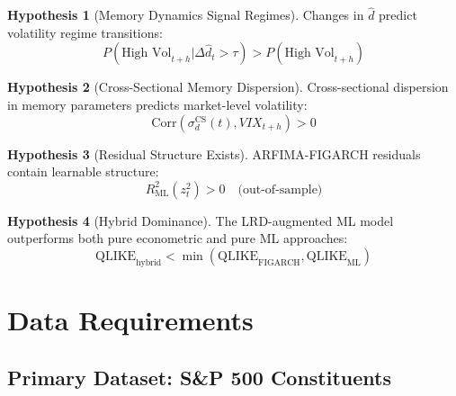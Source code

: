 \documentclass[11pt,a4paper]{article}
\theoremstyle{definition}
\newtheorem{hypothesis}{Hypothesis}[section]
\newcommand{\Corr}{\text{Corr}}
\newcommand{\dhat}{\hat{d}}
\begin{document}
\begin{hypothesis}[Memory Dynamics Signal Regimes]
Changes in $\dhat$ predict volatility regime transitions:
\begin{equation}
    P(\text{High Vol}_{t+h} | \Delta\dhat_t > \tau) > P(\text{High Vol}_{t+h})
\end{equation}
\end{hypothesis}

\begin{hypothesis}[Cross-Sectional Memory Dispersion]
Cross-sectional dispersion in memory parameters predicts market-level volatility:
\begin{equation}
    \Corr\left(\sigma_d^{\text{CS}}(t), VIX_{t+h}\right) > 0
\end{equation}
\end{hypothesis}

\begin{hypothesis}[Residual Structure Exists]
ARFIMA-FIGARCH residuals contain learnable structure:
\begin{equation}
    R^2_{\text{ML}}(z_t^2) > 0 \quad \text{(out-of-sample)}
\end{equation}
\end{hypothesis}

\begin{hypothesis}[Hybrid Dominance]
The LRD-augmented ML model outperforms both pure econometric and pure ML approaches:
\begin{equation}
    \text{QLIKE}_{\text{hybrid}} < \min\left(\text{QLIKE}_{\text{FIGARCH}}, \text{QLIKE}_{\text{ML}}\right)
\end{equation}
\end{hypothesis}

\section{Data Requirements}

\subsection{Primary Dataset: S\&P 500 Constituents}
\end{document}
